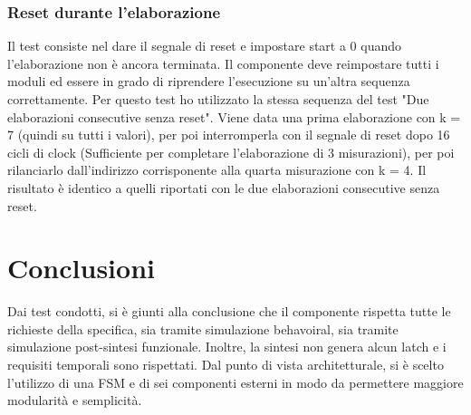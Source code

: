 \documentclass[12pt,a4paper]{scrartcl}
\begin{document}
     \subsubsection{Reset durante l'elaborazione}
     Il test consiste nel dare il segnale di reset e impostare start a 0 quando l'elaborazione non è ancora terminata. Il componente deve reimpostare tutti i moduli ed essere in grado di riprendere l'esecuzione su un'altra sequenza correttamente.
     \newline Per questo test ho utilizzato la stessa sequenza del test "Due elaborazioni consecutive senza reset". Viene data una prima elaborazione con k = 7 (quindi su tutti i valori), per poi interromperla con il segnale di reset dopo 16 cicli di clock (Sufficiente per completare l'elaborazione di 3 misurazioni), per poi rilanciarlo dall'indirizzo corrisponente alla quarta misurazione con k = 4. Il risultato è identico a quelli riportati con le due elaborazioni consecutive senza reset. 
\section{Conclusioni}
Dai test condotti, si è giunti alla conclusione che il componente rispetta tutte le richieste della specifica, sia tramite simulazione behavoiral, sia tramite simulazione post-sintesi funzionale. Inoltre, la sintesi non genera alcun latch e i requisiti temporali sono rispettati.
\newline Dal punto di vista architetturale, si è scelto l'utilizzo di una FSM e di sei componenti esterni in modo da permettere maggiore modularità e semplicità.
\newline 
\end{document}
